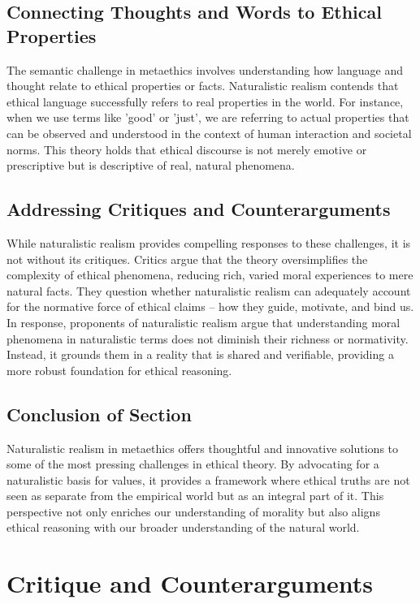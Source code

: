 \documentclass[12pt,a4paper]{article}
\begin{document}
\subsection{Connecting Thoughts and Words to Ethical Properties}
The semantic challenge in metaethics involves understanding how language and thought relate to ethical properties or facts. Naturalistic realism contends that ethical language successfully refers to real properties in the world. For instance, when we use terms like 'good' or 'just', we are referring to actual properties that can be observed and understood in the context of human interaction and societal norms. This theory holds that ethical discourse is not merely emotive or prescriptive but is descriptive of real, natural phenomena.

\subsection{Addressing Critiques and Counterarguments}
While naturalistic realism provides compelling responses to these challenges, it is not without its critiques. Critics argue that the theory oversimplifies the complexity of ethical phenomena, reducing rich, varied moral experiences to mere natural facts. They question whether naturalistic realism can adequately account for the normative force of ethical claims – how they guide, motivate, and bind us. In response, proponents of naturalistic realism argue that understanding moral phenomena in naturalistic terms does not diminish their richness or normativity. Instead, it grounds them in a reality that is shared and verifiable, providing a more robust foundation for ethical reasoning.

\subsection{Conclusion of Section}
Naturalistic realism in metaethics offers thoughtful and innovative solutions to some of the most pressing challenges in ethical theory. By advocating for a naturalistic basis for values, it provides a framework where ethical truths are not seen as separate from the empirical world but as an integral part of it. This perspective not only enriches our understanding of morality but also aligns ethical reasoning with our broader understanding of the natural world.

\section{Critique and Counterarguments}
\end{document}
